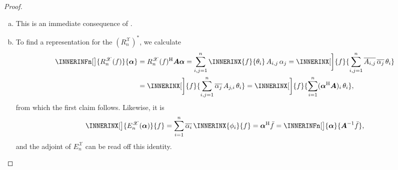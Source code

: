 \documentclass[a4paper]{paper}
\newcommand*{\SPC}[1]{{\ensuremath{\mathscr{#1}}}}
\newcommand*{\EXT}[2]{\ensuremath{E_{#1}^{#2}}}
\newcommand*{\REST}[2]{\ensuremath{R_{#1}^{#2}}}
\newcommand*{\RnX}{{\ensuremath{\REST{n}{\SPC{X}}}}}
\newcommand*{\EnX}{{\ensuremath{\EXT{n}{\SPC{X}}}}}
\newcommand*{\HERM}[1]{{\ensuremath{#1^{\mathrm{H}}}}}
\newcommand{\valpha}{\boldsymbol{\alpha}}
\newcommand{\vA}{\boldsymbol{A}}
\begin{document}
\begin{proof}~
 \begin{enumerate}[(a)]
  \item This is an immediate consequence of .
 
  \item To find a representation for the $(\RnX)^*$, we calculate
  \begin{align*}
   \INNERINFn[\big]{\RnX(f)}{\valpha} 
   &= \HERM{\RnX(f)} \vA \valpha = \sum_{i,j=1}^n \INNERINX{f}{\theta_i}\, A_{i,j}\, \alpha_j
   = \INNERINX[\bigg]{f}{\sum_{i,j=1}^n \overline{A_{i,j}}\, \overline{\alpha_j}\, \theta_i} \\
   &= \INNERINX[\bigg]{f}{\sum_{i,j=1}^n \overline{\alpha_j}\, A_{j,i}\, \theta_i} 
   = \INNERINX[\bigg]{f}{\sum_{i=1}^n (\HERM{\valpha} \vA)_i\, \theta_i},
  \end{align*}
  from which the first claim follows. Likewise, it is
  \begin{equation*}
   \INNERINX[\big]{\EnX(\valpha)}{f}
   = \sum_{i=1}^n \overline{\alpha_i}\, \INNERINX{\phi_i}{f}
   = \HERM{\valpha} \bar f
   = \INNERINFn[\big]{\valpha}{\vA^{-1} \bar f},
  \end{equation*}
  and the adjoint of $\EnX$ can be read off this identity.


\end{enumerate}
\end{proof}
\end{document}
